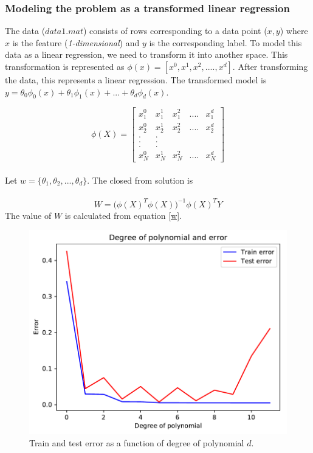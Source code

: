 \documentclass{article}
\begin{document}
\subsubsection{Modeling the problem as a transformed linear regression}
The data ($data1.mat$) consists of rows corresponding to a data point ($x,y$) where $x$ is the feature (\textit{1-dimensional}) and $y$ is the corresponding label. To model this data as a linear regression, we need to transform it into another space. This transformation is represented as $\phi(x) = [ x^0 , x^1, x^2, .... , x^d ]$. After transforming the data, this represents a linear regression. The transformed model is \\
$y = \theta_0 \phi_0 (x) + \theta_1 \phi_1 (x) + ... + \theta_d \phi_d (x)$.

\[
\phi (X) = 
\begin{bmatrix}
x_1 ^ 0 & x_1 ^1 & x_1 ^2 & .... & x_1 ^d \\
x_2 ^ 0 & x_2 ^1 & x_2 ^2 & .... & x_2 ^d \\
.        & .     &        &      &        \\
.        & .     &        &      &        \\
.        & .     &        &      &        \\

x_N ^ 0 & x_N ^1 & x_N ^2 & ....  & x_N ^d 
\end{bmatrix}
\]
\\
Let $w = \{ \theta_1, \theta_2,...,\theta_d \} $. The closed from solution is \\
\\
\begin{equation}
    W = \big(\phi(X)^T \phi(X)\big) ^{-1} \phi(X) ^T Y 
    \label{w}
\end{equation}
The value of $W$ is calculated from equation \ref{w}.\\
\begin{figure}
    \centering
    \includegraphics[scale = 0.9]{combined.pdf}
    \caption{Train and test error as a function of degree of polynomial $d$.}
 \label{fig:combined_error}
 \end{figure}
\end{document}
